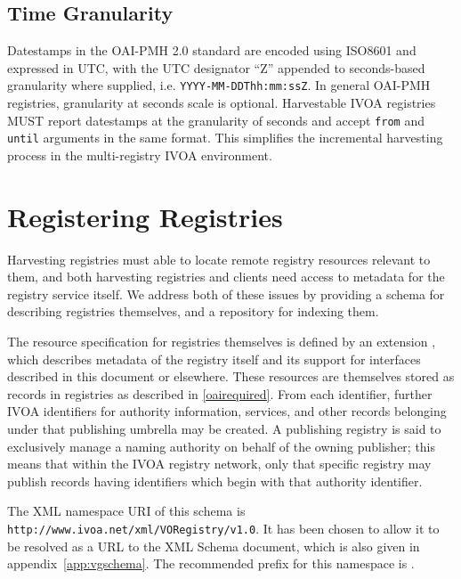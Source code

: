 \documentclass{ivoa}
\begin{document}
\subsection{Time Granularity}

\label{sect:timegranularity}

Datestamps in the OAI-PMH 2.0 standard are encoded using ISO8601 and
expressed in UTC, with the UTC designator ``Z'' appended to seconds-based
granularity where supplied, i.e. \texttt{YYYY-MM-DDThh:mm:ssZ}. In
general OAI-PMH registries, granularity at seconds scale is optional.
Harvestable IVOA registries MUST report datestamps at the granularity of
seconds and accept \texttt{from} and \texttt{until} arguments in the same format. This
simplifies the incremental harvesting process in the multi-registry IVOA
environment.

\section{Registering Registries}
\label{regreg}

Harvesting registries must able to locate remote registry resources
relevant to them, and both harvesting registries and clients need access
to metadata for the registry service itself. We address both of these
issues by providing a schema for describing registries themselves, and a
repository for indexing them.

The resource specification for registries themselves is defined by an
 extension , which describes 
metadata of the registry itself and its support for interfaces 
described in this document or elsewhere. 
These resources are themselves stored as
records in registries as described in \ref{oairequired}. From each
identifier, further IVOA identifiers for authority information,
services, and other records belonging under that publishing umbrella 
may be created. A publishing registry is said to exclusively manage a 
naming authority on behalf of the owning publisher; this means that 
within the IVOA registry network, only that specific registry may 
publish records having identifiers which begin with that authority identifier.

The XML namespace URI of this schema is
\nolinkurl{http://www.ivoa.net/xml/VORegistry/v1.0}.  It has been chosen
to allow it to be resolved as a URL to the XML Schema document, which is
also given in appendix~\ref{app:vgschema}. The recommended prefix for
this namespace is .
\end{document}
